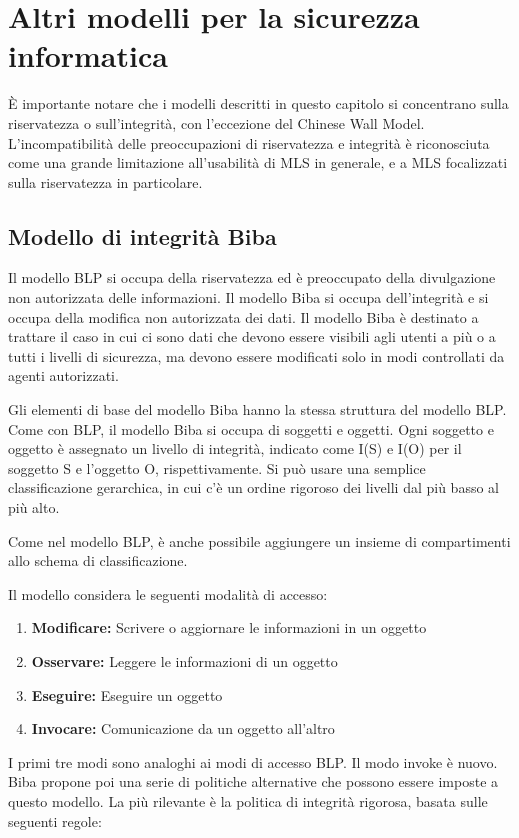 \section{Altri modelli per la sicurezza informatica}
È importante notare che i modelli descritti in questo capitolo si concentrano sulla riservatezza o sull'integrità, con l'eccezione del Chinese Wall Model. L'incompatibilità delle preoccupazioni di riservatezza e integrità è riconosciuta come una grande limitazione all'usabilità di MLS in generale, e a MLS focalizzati sulla riservatezza in particolare.

\subsection{Modello di integrità Biba}
Il modello BLP si occupa della riservatezza ed è preoccupato della divulgazione non autorizzata delle informazioni. Il modello Biba si occupa dell'integrità e si occupa della modifica non autorizzata dei dati. Il modello Biba è destinato a trattare il caso in cui ci sono dati che devono essere visibili agli utenti a più o a tutti i livelli di sicurezza, ma devono essere modificati solo in modi controllati da agenti autorizzati.

\singlespacing

Gli elementi di base del modello Biba hanno la stessa struttura del modello BLP. Come con BLP, il modello Biba si occupa di soggetti e oggetti. Ogni soggetto e oggetto è assegnato un livello di integrità, indicato come I(S) e I(O) per il soggetto S e l'oggetto O, rispettivamente. Si può usare una semplice classificazione gerarchica, in cui c'è un ordine rigoroso dei livelli dal più basso al più alto.

\singlespacing

Come nel modello BLP, è anche possibile aggiungere un insieme di compartimenti allo schema di classificazione. 

\singlespacing

Il modello considera le seguenti modalità di accesso:

\begin{enumerate}
    \item \textbf{Modificare:} Scrivere o aggiornare le informazioni in un oggetto
    
    \item \textbf{Osservare:} Leggere le informazioni di un oggetto
    
    \item \textbf{Eseguire:} Eseguire un oggetto
    
    \item \textbf{Invocare:} Comunicazione da un oggetto all'altro
\end{enumerate}
I primi tre modi sono analoghi ai modi di accesso BLP. Il modo invoke è nuovo. Biba propone poi una serie di politiche alternative che possono essere imposte a questo modello. La più rilevante è la politica di integrità rigorosa, basata sulle seguenti regole:


